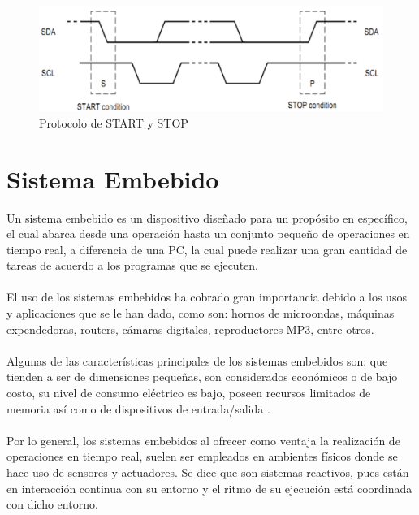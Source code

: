 \begin{figure}[H]
	\centering
	\includegraphics[scale=.25]{Capitulo2/images/startstop.png}
	\caption{Protocolo de START y STOP}
	\label{fig:}
\end{figure}



\section{Sistema Embebido}
Un sistema embebido es un dispositivo diseñado para un propósito en específico, el cual abarca desde una operación hasta un conjunto pequeño de operaciones en tiempo real, a diferencia de una PC, la cual puede realizar una gran cantidad de tareas de acuerdo a los programas que se ejecuten. 
\paragraph{}
El uso de los sistemas embebidos ha cobrado gran importancia debido a los usos y aplicaciones que se le han dado, como son: hornos de microondas, máquinas expendedoras, routers, cámaras digitales, reproductores MP3, entre otros. 
\paragraph{}
Algunas de las características principales de los sistemas embebidos son: que tienden a ser de dimensiones pequeñas, son considerados económicos o de bajo costo, su nivel de consumo eléctrico es bajo, poseen recursos limitados de memoria así como de dispositivos de entrada/salida \citep{MarcoTeorico14}.
\paragraph{}
Por lo general, los sistemas embebidos al ofrecer como ventaja la realización de operaciones en tiempo real, suelen ser empleados en ambientes físicos donde se hace uso de sensores y actuadores. Se dice que son sistemas reactivos, pues están en interacción continua con su entorno y el ritmo de su ejecución está coordinada con dicho entorno. 
